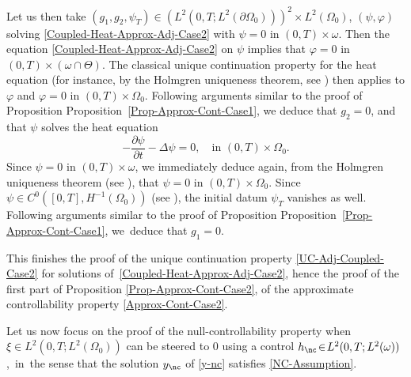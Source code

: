Let us then take $(g_1, g_2, \psi_T) \in (L^2(0,T; L^2(\partial\Omega_0)))^2\times L^2(\Omega_0)$, $(\psi, \varphi)$ solving \eqref{Coupled-Heat-Approx-Adj-Case2} with $\psi = 0$ in $(0,T) \times \omega$. Then the equation \eqref{Coupled-Heat-Approx-Adj-Case2} on $\psi$ implies that $\varphi = 0$ in $(0,T)\times {(\omega\cap \Theta)}$. The classical unique continuation property for the heat equation (for instance, by the Holmgren uniqueness theorem, see \eg \cite[\S8.6 \& Th.\,8.6.5]{Hormander-2003}) then applies to $\varphi$ and $\varphi = 0$ in $(0,T)\times \Omega_0$. Following arguments similar to the proof of Proposition Proposition~\ref{Prop-Approx-Cont-Case1}, we deduce that $g_2 = 0$, and that $\psi$ solves the heat equation
\[
-\dfrac{\partial \psi}{\partial t}-\Delta \psi =0, \quad \text{in }(0,T) \times \Omega_0.
\]
Since $\psi = 0$ in $(0,T) \times \omega$, we immediately deduce again, from the Holmgren uniqueness theorem (see \eg \cite[\S8.6 \& Th.\,8.6.5]{Hormander-2003}), that $\psi = 0$ in $(0,T) \times \Omega_0$. Since $\psi\in C^0([0,T],H^{-1}(\Omega_0))$ (see \eg \cite[Prop.\,7.1.3]{TWBook}), the initial datum $\psi_T$ vanishes as well. Following arguments similar to the proof of Proposition Proposition~\ref{Prop-Approx-Cont-Case1}, we~deduce that $g_1 = 0$.

This finishes the proof of the unique continuation property \eqref{UC-Adj-Coupled-Case2} for solutions of~\eqref{Coupled-Heat-Approx-Adj-Case2}, hence the proof of the first part of Proposition \ref{Prop-Approx-Cont-Case2}, \ie of the approximate controllability property \eqref{Approx-Cont-Case2}.

Let us now focus on the proof of the null-controllability property when~$\xi\in L^2(0,T; L^2(\Omega_0))$ can be steered to $0$ using a control $h_{\nc} \!\in\! L^2(0,T; L^2(\omega))$,~in~the sense that the solution $y_{\nc}$ of \eqref{y-nc} satisfies \eqref{NC-Assumption}.


